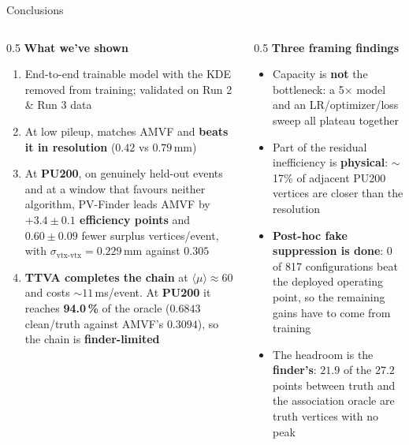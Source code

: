 \documentclass[xcolor=table,aspectratio=169]{beamer}
\begin{document}
\begin{frame}[shrink=15]{Conclusions}
    \begin{columns}[t]
        \begin{column}{0.5\linewidth}
            \textbf{What we've shown}
            \begin{enumerate}
                \setlength\itemsep{0.4em}
                \item End-to-end trainable model with the KDE removed from training; validated on Run 2 \& Run 3 data
                \item At low pileup, matches AMVF and \textbf{beats it in resolution} ($0.42$ vs $0.79$\,mm)
                \item At \textbf{PU200}, on genuinely held-out events and at a window
                    that favours neither algorithm, PV-Finder leads AMVF by
                    \textbf{$+3.4 \pm 0.1$ efficiency points} and
                    $0.60 \pm 0.09$ fewer surplus vertices/event,
                    with $\sigma_{\text{vtx-vtx}} = 0.229$\,mm against $0.305$
                \item \textbf{TTVA completes the chain} at $\langle\mu\rangle\!\approx\!60$
                    and costs \(\sim\)$11$\,ms/event. At \textbf{PU200} it reaches
                    \textbf{94.0\,\%} of the oracle ($0.6843$ clean/truth against
                    AMVF's $0.3094$), so the chain is \textbf{finder-limited}
            \end{enumerate}
        \end{column}
        \begin{column}{0.5\linewidth}
            \textbf{Three framing findings}
            \begin{itemize}
                \setlength\itemsep{0.35em}
                \item Capacity is \textbf{not} the bottleneck: a 5$\times$ model and an LR/optimizer/loss sweep all plateau together
                \item Part of the residual inefficiency is \textbf{physical}: $\sim$17\% of adjacent PU200 vertices are closer than the resolution
                \item \textbf{Post-hoc fake suppression is done}: 0 of 817 configurations beat the deployed operating point, so the remaining gains have to come from training
                \item The headroom is the \textbf{finder's}: $21.9$ of the $27.2$ points between truth and the association oracle are truth vertices with no peak
            \end{itemize}
        \end{column}
    \end{columns}
\end{frame}
\end{document}
